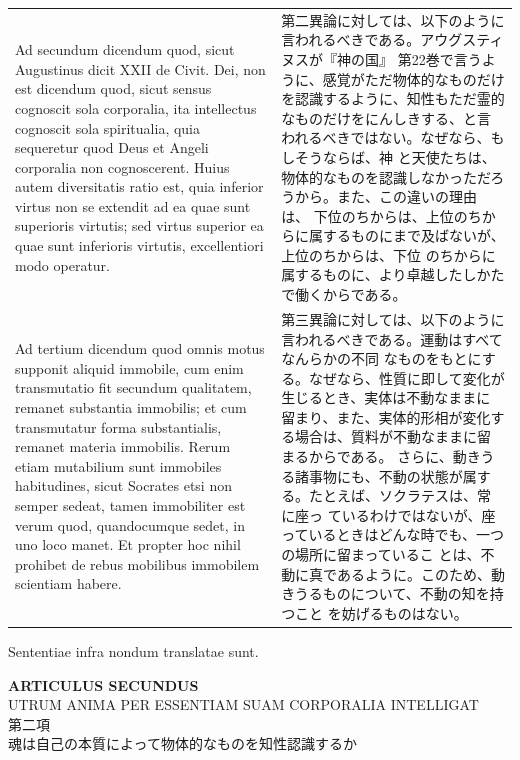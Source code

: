 \documentclass[paper=a4paper,fontsize=10pt,jafontsize=9pt,titlepage]{jlreq}
\begin{document}
\begin{longtable}{p{21em}p{21em}}
 \\[1em]

 Ad secundum dicendum quod, sicut Augustinus dicit XXII de Civit. Dei, non est
 dicendum quod, sicut sensus cognoscit sola corporalia, ita intellectus
 cognoscit sola spiritualia, quia sequeretur quod Deus et Angeli corporalia non
 cognoscerent. Huius autem diversitatis ratio est, quia inferior virtus non se
 extendit ad ea quae sunt superioris virtutis; sed virtus superior ea quae sunt
 inferioris virtutis, excellentiori modo operatur.

 &

 第二異論に対しては、以下のように言われるべきである。アウグスティヌスが『神の国』
 第22巻で言うように、感覚がただ物体的なものだけを認識するように、知性もただ霊的
 なものだけをにんしきする、と言われるべきではない。なぜなら、もしそうならば、神
 と天使たちは、物体的なものを認識しなかっただろうから。また、この違いの理由は、
 下位のちからは、上位のちからに属するものにまで及ばないが、上位のちからは、下位
 のちからに属するものに、より卓越したしかたで働くからである。

 \\[1em]

 Ad tertium dicendum quod omnis motus supponit aliquid immobile, cum enim
 transmutatio fit secundum qualitatem, remanet substantia immobilis; et cum
 transmutatur forma substantialis, remanet materia immobilis. Rerum etiam
 mutabilium sunt immobiles habitudines, sicut Socrates etsi non semper sedeat,
 tamen immobiliter est verum quod, quandocumque sedet, in uno loco manet. Et
 propter hoc nihil prohibet de rebus mobilibus immobilem scientiam habere.

 &

 第三異論に対しては、以下のように言われるべきである。運動はすべてなんらかの不同
 なものをもとにする。なぜなら、性質に即して変化が生じるとき、実体は不動なままに
 留まり、また、実体的形相が変化する場合は、質料が不動なままに留まるからである。
 さらに、動きうる諸事物にも、不動の状態が属する。たとえば、ソクラテスは、常に座っ
 ているわけではないが、座っているときはどんな時でも、一つの場所に留まっているこ
 とは、不動に真であるように。このため、動きうるものについて、不動の知を持つこと
 を妨げるものはない。
 
 
\end{longtable}

Sententiae infra nondum translatae sunt.

\newpage


\begin{center}
{\Large {\bfseries ARTICULUS SECUNDUS}}\\
{\large UTRUM ANIMA PER ESSENTIAM SUAM CORPORALIA INTELLIGAT}\\
{\Large 第二項\\魂は自己の本質によって物体的なものを知性認識するか}
\end{center}
\end{document}
